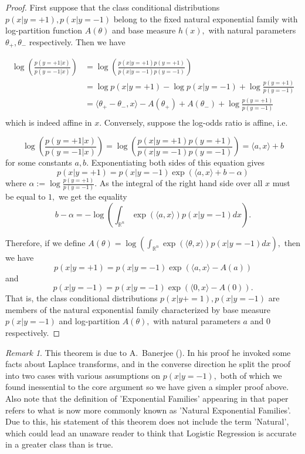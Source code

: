 \documentclass[BSc]{usydthesis}
\numberwithin{equation}{chapter}
\theoremstyle{remark}
\newtheorem{Remark}[equation]{Remark}
\begin{document}
\begin{proof}
 First suppose that the class conditional distributions $p(x | y=+1), p(x | y=-1)$ belong to the fixed natural exponential family with log-partition function $A(\theta)$ and base measure $h(x),$ with natural parameters $\theta_+, \theta_-$ respectively. Then we have
 
 \begin{align*}
  \log \left( \frac{ p(y=+1|x) }{p(y=-1|x)} \right) &= \log \left( \frac{ p(x | y=+1) p(y=+1) }{p(x | y=-1)p(y=-1)} \right) \\
  &= \log p(x | y=+1) - \log p(x | y=-1) + \log \frac{ p(y=+1)}{p(y=-1)} \\
  &= \langle \theta_+ - \theta_- , x \rangle  - A(\theta_+) + A(\theta_-) + \log \frac{ p(y=+1)}{p(y=-1)} \\
 \end{align*}
which is indeed affine in $x.$ Conversely, suppose the log-odds ratio is affine, i.e. 

$$ \log \left( \frac{ p(y=+1|x) }{p(y=-1|x)} \right) = \log \left( \frac{ p(x | y=+1) p(y=+1) }{p(x | y=-1)p(y=-1)} \right)  = \langle a, x \rangle + b$$ for some constants $a, b.$ Exponentiating both sides of this equation gives $$ p(x|y=+1) = p(x | y=-1) \exp( \langle a, x \rangle + b - \alpha)$$ where $\alpha := \log \frac{p(y=+1)}{p(y=-1)}.$ As the integral of the right hand side over all $x$ must be equal to $1,$ we get the equality $$b-\alpha = - \log \left( \int_{\mathbb{R}^n} \exp (\langle a, x \rangle) p(x | y=-1) dx \right).$$

Therefore, if we define $A(\theta) = \log \left( \int_{\mathbb{R}^n} \exp (\langle \theta, x \rangle) p(x | y=-1) dx \right),$ then we have $$ p(x | y=+1) = p(x | y=-1) \exp( \langle a, x \rangle - A(a))$$ and $$ p(x | y=-1) = p(x | y=-1) \exp( \langle 0, x \rangle - A(0)).$$ That is, the class conditional distributions $p(x | y+=1), p(x|y=-1)$ are members of the natural exponential family characterized by base measure $p(x|y=-1)$ and log-partition $A(\theta),$ with natural parameters $a$ and $ 0$ respectively. 


\end{proof}

\begin{Remark}
 This theorem is due to A.~Banerjee (\cite{logodds}). In his proof he invoked some facts about Laplace transforms, and in the converse direction he split the proof into two cases with various assumptions on $p(x|y=-1),$ both of which we found inessential to the core argument so we have given a simpler proof above. Also note that the definition of 'Exponential Families' appearing in that paper refers to what is now more commonly known as 'Natural Exponential Families'. Due to this, his statement of this theorem  does not include the term 'Natural', which could lead an unaware reader to think that Logistic Regression is accurate in a greater class than is true.
\end{Remark}
\end{document}
